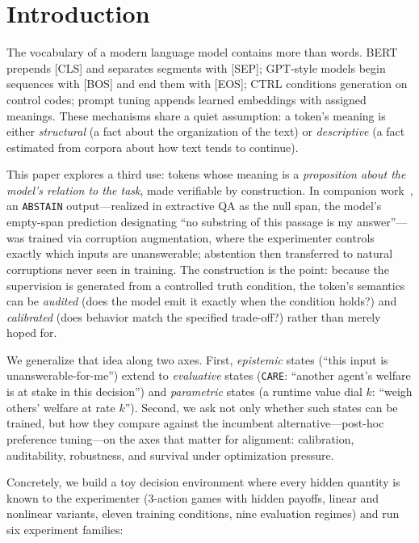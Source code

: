 \documentclass[11pt]{article}
\newcommand{\care}{\texttt{CARE}}
\newcommand{\abstain}{\texttt{ABSTAIN}}
\begin{document}
\section{Introduction}

The vocabulary of a modern language model contains more than words. BERT prepends [CLS] and separates segments with [SEP]; GPT-style models begin sequences with [BOS] and end them with [EOS]; CTRL conditions generation on control codes; prompt tuning appends learned embeddings with assigned meanings. These mechanisms share a quiet assumption: a token's meaning is either \emph{structural} (a fact about the organization of the text) or \emph{descriptive} (a fact estimated from corpora about how text tends to continue).

This paper explores a third use: tokens whose meaning is a \emph{proposition about the model's relation to the task}, made verifiable by construction. In companion work~\cite{kanber2026abstain}, an \abstain{} output---realized in extractive QA as the null span, the model's empty-span prediction designating ``no substring of this passage is my answer''---was trained via corruption augmentation, where the experimenter controls exactly which inputs are unanswerable; abstention then transferred to natural corruptions never seen in training. The construction is the point: because the supervision is generated from a controlled truth condition, the token's semantics can be \emph{audited} (does the model emit it exactly when the condition holds?) and \emph{calibrated} (does behavior match the specified trade-off?) rather than merely hoped for.

We generalize that idea along two axes. First, \emph{epistemic} states (``this input is unanswerable-for-me'') extend to \emph{evaluative} states (\care{}: ``another agent's welfare is at stake in this decision'') and \emph{parametric} states (a runtime value dial $k$: ``weigh others' welfare at rate $k$''). Second, we ask not only whether such states can be trained, but how they compare against the incumbent alternative---post-hoc preference tuning---on the axes that matter for alignment: calibration, auditability, robustness, and survival under optimization pressure.

Concretely, we build a toy decision environment where every hidden quantity is known to the experimenter (3-action games with hidden payoffs, linear and nonlinear variants, eleven training conditions, nine evaluation regimes) and run six experiment families:
\end{document}
